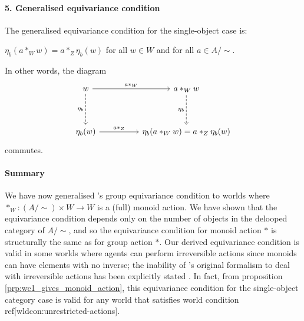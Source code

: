 \paragraph{5. Generalised equivariance condition}
The generalised equivariance condition for the single-object case is:
\begin{center}
    $\eta_{b}(a *_{W} w) = a *_{Z} \eta_{b}(w)$ for all $w \in W$ and for all $a \in A/\sim$.
\end{center}
In other words, the diagram
\begin{equation}
\begin{tikzcd}
    w && {a *_{W} w} \\
    \\
    {\eta_{b}(w)} && {\eta_{b}(a *_{W} w) = a *_{Z} \eta_{b}(w)}
    \arrow["{a *_{W}}", from=1-1, to=1-3]
    \arrow["{a *_{Z}}", from=3-1, to=3-3]
    \arrow["{\eta_{b}}"', dashed, from=1-3, to=3-3]
    \arrow["{\eta_{b}}"', dashed, from=1-1, to=3-1]
\end{tikzcd}
\end{equation}
commutes.

\paragraph{Summary}
We have now generalised \autocite{Higgins2018}'s group equivariance condition to worlds where $*_{W}: (A/\sim) \times W \to W$ is a (full) monoid action.
We have shown that the equivariance condition depends only on the number of objects in the delooped category of $A/\sim$, and so the equivariance condition for monoid action $*$ is structurally the same as for group action $*$.
Our derived equivariance condition is valid in some worlds where agents can perform irreversible actions since monoids can have elements with no inverse; the inability of \autocite{Higgins2018}'s original formalism to deal with irreversible actions has been explicitly stated \cite[page 4]{caselles2019symmetry}.
In fact, from proposition \ref{prp:wc1_gives_monoid_action}, this equivariance condition for the single-object category case is valid for any world that satisfies world condition ref[wldcon:unrestricted-actions].

